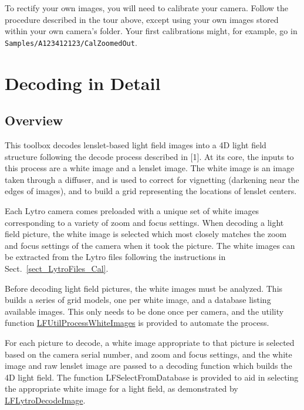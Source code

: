 \documentclass[onecolumn]{article}
\newcommand{\CiteFunction}[1]{\hyperlink{#1}{\small #1}}
\newcommand{\SupFunction}[1]{{\small #1}}
\newcommand{\SymbolText}[1]{\texttt{\small #1}}
\begin{document}
To rectify your own images, you will need to calibrate your camera.  Follow the procedure described in the tour above, except using your own images stored within your own camera's folder.  Your first calibrations might, for example, go in \SymbolText{Samples/A123412123/CalZoomedOut}.




\section{Decoding in Detail}

\subsection{Overview}

This toolbox decodes lenslet-based light field images into a 4D light field structure following the decode process described in [1]. At its core, the inputs to this process are a white image and a lenslet image. The white image is an image taken through a diffuser, and is used to correct for vignetting (darkening near the edges of images), and to build a grid representing the locations of lenslet centers.

Each Lytro camera comes preloaded with a unique set of white images corresponding to a variety of zoom and focus settings. When decoding a light field picture, the white image is selected which most closely matches the zoom and focus settings of the camera when it took the picture. The white images can be extracted from the Lytro files following the instructions in Sect.~\ref{sect_LytroFiles_Cal}.

Before decoding light field pictures, the white images must be analyzed. This builds a series of grid models, one per white image, and a database listing available images. This only needs to be done once per camera, and the utility function \CiteFunction{LFUtilProcessWhiteImages} is provided to automate the process.

For each picture to decode, a white image appropriate to that picture is selected based on the camera serial number, and zoom and focus settings, and the white image and raw lenslet image are passed to a decoding function which builds the 4D light field. The function \SupFunction{LFSelectFromDatabase} is provided to aid in selecting the appropriate white image for a light field, as demonstrated by \CiteFunction{LFLytroDecodeImage}.
\end{document}
